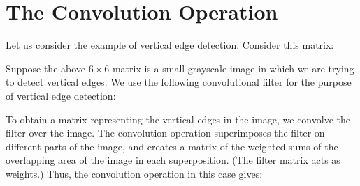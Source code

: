 \documentclass[a4paper, 12pt]{report}
\begin{document}
\section{The Convolution Operation}
Let us consider the example of vertical edge detection. Consider this matrix:
\begin{figure}[H]
\centering
{}
\end{figure}
Suppose the above $6\times 6$ matrix is a small grayscale image in which we are trying to detect vertical edges. We use the following convolutional filter for the purpose of vertical edge detection:
\begin{figure}[H]
\centering
{}
\end{figure}
To obtain a matrix representing the vertical edges in the image, we convolve the filter over the image. The convolution operation superimposes the filter on different parts of the image, and creates a matrix of the weighted sums of the overlapping area of the image in each superposition. (The filter matrix acts as weights.) Thus, the convolution operation in this case gives:
\begin{figure}[H]
\centering
{}
\end{figure}
\end{document}
